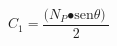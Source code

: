 \begin{equation}
C_{\mathrm{1}}\mathrm{=}\frac{\mathrm{(}N_P\mathrm{\bullet }{\mathrm{sen} \theta \mathrm{)}\ }}{\mathrm{2}}
\end{equation}